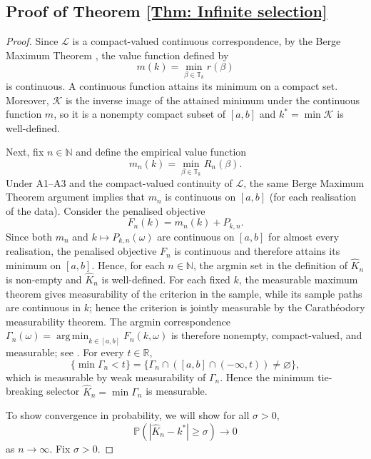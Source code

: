 \documentclass[12pt]{article}
\DeclareMathOperator*{\argmin}{arg\,min}
\theoremstyle{remark}
\theoremstyle{plain}
\begin{document}
\subsection{Proof of Theorem \ref{Thm: Infinite selection}}
\begin{proof}
Since $\mathcal{L}$ is a compact-valued continuous correspondence,
by the Berge Maximum Theorem \citep[Theorem 17.31]{aliprantis_infinite_2006},
the value function defined by
\[
m(k)=\min_{\beta\in\mathbb{T}_{k}}r(\beta)
\]
is continuous. A continuous function attains its minimum on a compact
set. Moreover, $\mathcal K$ is the inverse image of the attained minimum under the continuous function $m$, so it is a nonempty compact subset of $[a,b]$ and $k^*=\min\mathcal K$ is well-defined.

Next, fix $n\in\mathbb{N}$ and define the empirical value function
\[
m_{n}(k)=\min_{\beta\in\mathbb{T}_{k}}R_{n}(\beta).
\]
Under A1--A3 and the compact-valued continuity of $\mathcal{L}$,
the same Berge Maximum Theorem argument implies that $m_{n}$ is continuous
on $\left[a,b\right]$ (for each realisation of the data). Consider
the penalised objective
\[
F_{n}(k)=m_{n}(k)+P_{k,n}.
\]
Since both $m_n$ and $k\mapsto P_{k,n}(\omega)$ are continuous on $\left[a,b\right]$ for almost every realisation, the penalised objective $F_n$ is continuous and therefore attains its minimum on $\left[a,b\right]$. Hence, for each $n\in\mathbb{N}$, the argmin set in the definition
of $\hat{K}_{n}$ is non-empty and $\hat{K}_{n}$ is well-defined. For each fixed $k$, the measurable maximum theorem gives measurability of the criterion in the sample, while its sample paths are continuous in $k$; hence the criterion is jointly measurable by the Carath\'eodory measurability theorem. The argmin correspondence $\Gamma_n(\omega)=\argmin_{k\in[a,b]}F_n(k,\omega)$ is therefore nonempty, compact-valued, and measurable; see \citet[Theorem 18.19]{aliprantis_infinite_2006}. For every $t\in\mathbb R$,
\[
\{\min\Gamma_n<t\}=\{\Gamma_n\cap([a,b]\cap(-\infty,t))\ne\varnothing\},
\]
which is measurable by weak measurability of $\Gamma_n$. Hence the minimum tie-breaking selector $\widehat K_n=\min\Gamma_n$ is measurable.

To show convergence in probability, we will show for all $\sigma>0$,
\[
\mathbb{P}\left(\left|\hat{K}_{n}-k^{*}\right|\ge\sigma\right)\to0
\]
as $n\to\infty$. Fix $\sigma>0$.


\end{proof}
\end{document}
